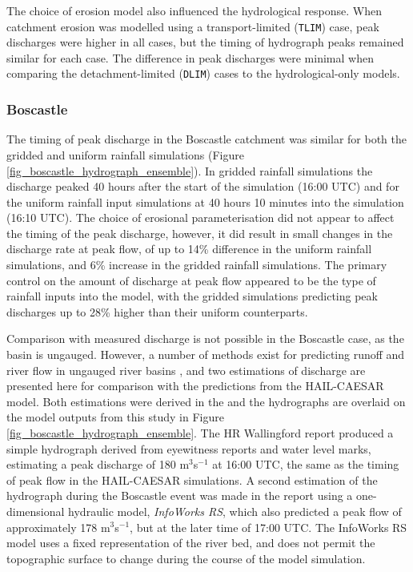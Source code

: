 The choice of erosion model also influenced the hydrological response. When catchment erosion was modelled using a transport-limited (\texttt{TLIM}) case, peak discharges were higher in all cases, but the timing of hydrograph peaks remained similar for each case. The difference in peak discharges were minimal when comparing the detachment-limited (\texttt{DLIM}) cases to the hydrological-only models.

\subsubsection{Boscastle}
The timing of peak discharge in the Boscastle catchment was similar for both the gridded and uniform rainfall simulations (Figure \ref{fig_boscastle_hydrograph_ensemble}). In gridded rainfall simulations the discharge peaked 40 hours after the start of the simulation (16:00 UTC) and for the uniform rainfall input simulations at 40 hours 10 minutes into the simulation (16:10 UTC). The choice of erosional parameterisation did not appear to affect the timing of the peak discharge, however, it did result in small changes in the discharge rate at peak flow, of up to 14\% difference in the uniform rainfall simulations, and 6\% increase in the gridded rainfall simulations. The primary control on the amount of discharge at peak flow appeared to be the type of rainfall inputs into the model, with the gridded simulations predicting peak discharges up to 28\% higher than their uniform counterparts. 

Comparison with measured discharge is not possible in the Boscastle case, as the basin is ungauged. However, a number of methods exist for predicting runoff and river flow in ungauged river basins \citep{sivapalan2003prediction,bloschl2013runoff}, and two estimations of discharge are presented here for comparison with the predictions from the HAIL-CAESAR model. Both estimations were derived in the \citet{wallingford2005flooding} and the hydrographs are overlaid on the model outputs from this study in Figure \ref{fig_boscastle_hydrograph_ensemble}. The HR Wallingford report produced a simple hydrograph derived from eyewitness reports and water level marks, estimating a peak discharge of 180 m\(^3\)s\(^{-1}\) at 16:00 UTC, the same as the timing of peak flow in the HAIL-CAESAR simulations. A second estimation of the hydrograph during the Boscastle event was made in the report using a one-dimensional hydraulic model, \textit{InfoWorks RS}, which also predicted a peak flow of approximately 178 m\(^3\)s\(^{-1}\), but at the later time of 17:00 UTC. The InfoWorks RS model uses a fixed representation of the river bed, and does not permit the topographic surface to change during the course of the model simulation. 

